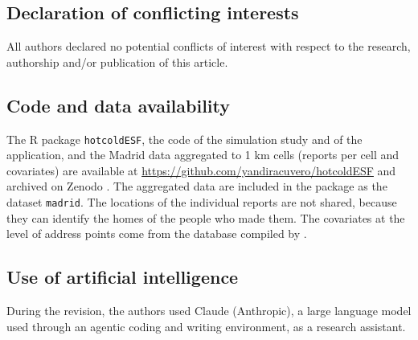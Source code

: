 \documentclass[12pt, a4paper]{article}
\newcommand{\todo}[1]{{\leavevmode\color{gray}[To write: #1]}}
\begin{document}
\subsection*{Declaration of conflicting interests}
All authors declared no potential conflicts of interest with respect to the research, authorship and/or publication of this article.
\subsection*{Code and data availability}
The R package \texttt{hotcoldESF}, the code of the simulation study and of the application, and the Madrid data aggregated to 1 km cells (reports per cell and covariates) are available at \url{https://github.com/yandiracuvero/hotcoldESF} and archived on Zenodo \citep[\url{https://doi.org/10.5281/zenodo.23717893}]{hotcoldesf2026}. The aggregated data are included in the package as the dataset \texttt{madrid}. The locations of the individual reports are not shared, because they can identify the homes of the people who made them. The covariates at the level of address points come from the database compiled by \citet{tamayo2013identificacion}.
\subsection*{Use of artificial intelligence}
During the revision, the authors used Claude (Anthropic), a large language model used through an agentic coding and writing environment, as a research assistant. %




%
\end{document}
